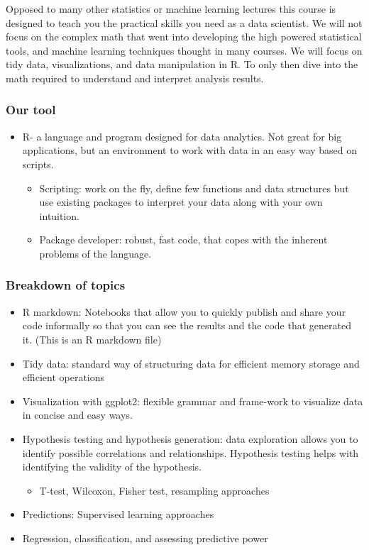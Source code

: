 \documentclass[
]{article}
\providecommand{\tightlist}{%
  \setlength{\itemsep}{0pt}\setlength{\parskip}{0pt}}
\begin{document}
Opposed to many other statistics or machine learning lectures this
course is designed to teach you the practical skills you need as a data
scientist. We will not focus on the complex math that went into
developing the high powered statistical tools, and machine learning
techniques thought in many courses. We will focus on tidy data,
visualizations, and data manipulation in R. To only then dive into the
math required to understand and interpret analysis results.

\hypertarget{our-tool}{%
\subsubsection{Our tool}\label{our-tool}}

\begin{itemize}
\tightlist
\item
  R- a language and program designed for data analytics. Not great for
  big applications, but an environment to work with data in an easy way
  based on scripts.

  \begin{itemize}
  \tightlist
  \item
    Scripting: work on the fly, define few functions and data structures
    but use existing packages to interpret your data along with your own
    intuition.
  \item
    Package developer: robust, fast code, that copes with the inherent
    problems of the language.
  \end{itemize}
\end{itemize}

\hypertarget{breakdown-of-topics}{%
\subsubsection{Breakdown of topics}\label{breakdown-of-topics}}

\begin{itemize}
\tightlist
\item
  R markdown: Notebooks that allow you to quickly publish and share your
  code informally so that you can see the results and the code that
  generated it. (This is an R markdown file)
\item
  Tidy data: standard way of structuring data for efficient memory
  storage and efficient operations
\item
  Visualization with ggplot2: flexible grammar and frame-work to
  visualize data in concise and easy ways.
\item
  Hypothesis testing and hypothesis generation: data exploration allows
  you to identify possible correlations and relationships. Hypothesis
  testing helps with identifying the validity of the hypothesis.

  \begin{itemize}
  \tightlist
  \item
    T-test, Wilcoxon, Fisher test, resampling approaches
  \end{itemize}
\item
  Predictions: Supervised learning approaches
\item
  Regression, classification, and assessing predictive power
\end{itemize}
\end{document}

